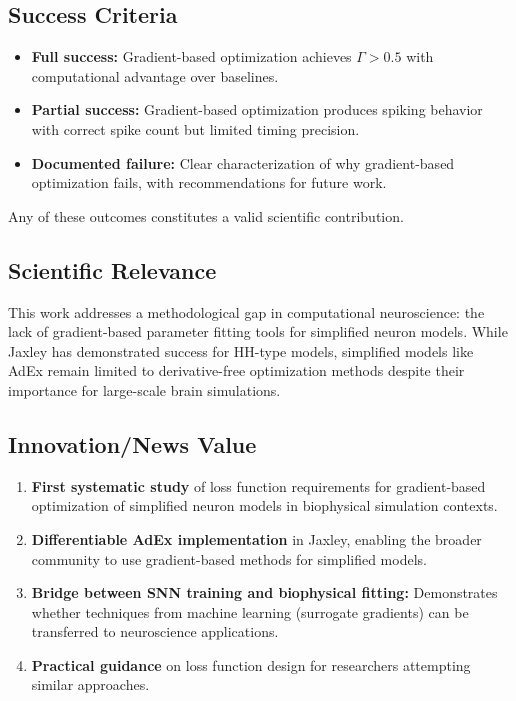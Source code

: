 \documentclass{article}
\begin{document}
\subsection{Success Criteria}

\begin{itemize}
    \item \textbf{Full success:} Gradient-based optimization achieves $\Gamma > 0.5$ with computational advantage over baselines.
    \item \textbf{Partial success:} Gradient-based optimization produces spiking behavior with correct spike count but limited timing precision.
    \item \textbf{Documented failure:} Clear characterization of why gradient-based optimization fails, with recommendations for future work.
\end{itemize}

Any of these outcomes constitutes a valid scientific contribution.

\subsection{Scientific Relevance}

This work addresses a methodological gap in computational neuroscience: the lack of gradient-based parameter fitting tools for simplified neuron models. While Jaxley has demonstrated success for HH-type models, simplified models like AdEx remain limited to derivative-free optimization methods despite their importance for large-scale brain simulations.

\subsection{Innovation/News Value}

\begin{enumerate}
    \item \textbf{First systematic study} of loss function requirements for gradient-based optimization of simplified neuron models in biophysical simulation contexts.
    \item \textbf{Differentiable AdEx implementation} in Jaxley, enabling the broader community to use gradient-based methods for simplified models.
    \item \textbf{Bridge between SNN training and biophysical fitting:} Demonstrates whether techniques from machine learning (surrogate gradients) can be transferred to neuroscience applications.
    \item \textbf{Practical guidance} on loss function design for researchers attempting similar approaches.
\end{enumerate}
\end{document}
